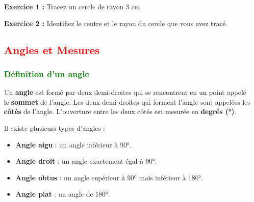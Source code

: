 \documentclass{article}
\begin{document}
\vspace{0.2cm}

\begin{tcolorbox}[colback=yellow!10!white, colframe=yellow!75!black, title=\textcolor{white}{Application directe}, sharp corners=south]
    \textbf{Exercice 1 :} Tracez un cercle de rayon 3 cm.

    \textbf{Exercice 2 :} Identifiez le centre et le rayon du cercle que vous avez tracé.
\end{tcolorbox}

\vspace{0.5cm}

\subsection{\textcolor{red}{Angles et Mesures}}

\subsubsection{\textcolor{green}{Définition d'un angle}}

\begin{tcolorbox}[colback=red!10!white, colframe=red!75!black, title=\textcolor{white}{Définition : Angle}, sharp corners=south]
    Un \textbf{angle} est formé par deux demi-droites qui se rencontrent en un point appelé le \textbf{sommet} de l'angle. Les deux demi-droites qui forment l'angle sont appelées les \textbf{côtés} de l'angle. L'ouverture entre les deux côtés est mesurée en \textbf{degrés (°)}.
\end{tcolorbox}

\begin{tcolorbox}[colback=purple!10!white, colframe=purple!75!black, title=\textcolor{white}{Note}, sharp corners=south]
    Il existe plusieurs types d'angles :
    \begin{itemize}
        \item \textbf{Angle aigu} : un angle inférieur à 90°.
        \item \textbf{Angle droit} : un angle exactement égal à 90°.
        \item \textbf{Angle obtus} : un angle supérieur à 90° mais inférieur à 180°.
        \item \textbf{Angle plat} : un angle de 180°.
    \end{itemize}
\end{tcolorbox}

\vspace{0.2cm}
\end{document}
